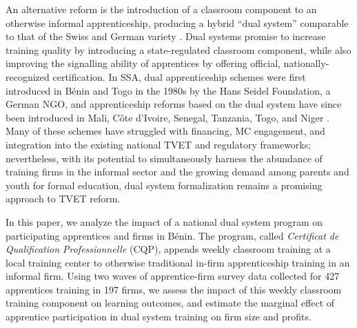 \documentclass[
  a4paper, twoside, 12pt]{book}
\begin{document}
An alternative reform is the introduction of a classroom component to an otherwise informal apprenticeship, producing a hybrid ``dual system'' comparable to that of the Swiss and German variety \autocite{walther2011}. Dual systems promise to increase training quality by introducing a state-regulated classroom component, while also improving the signalling ability of apprentices by offering official, nationally-recognized certification. In SSA, dual apprenticeship schemes were first introduced in Bénin and Togo in the 1980s by the Hans Seidel Foundation, a German NGO, and apprenticeship reforms based on the dual system have since been introduced in Mali, Côte d'Ivoire, Senegal, Tanzania, Togo, and Niger \autocite{walther2011,ilo2020a}. Many of these schemes have struggled with financing, MC engagement, and integration into the existing national TVET and regulatory frameworks; nevertheless, with its potential to simultaneously harness the abundance of training firms in the informal sector and the growing demand among parents and youth for formal education, dual system formalization remains a promising approach to TVET reform.

In this paper, we analyze the impact of a national dual system program on participating apprentices and firms in Bénin. The program, called \emph{Certificat de Qualification Professionnelle} (CQP), appends weekly classroom training at a local training center to otherwise traditional in-firm apprenticeship training in an informal firm. Using two waves of apprentice-firm survey data collected for 427 apprentices training in 197 firms, we assess the impact of this weekly classroom training component on learning outcomes, and estimate the marginal effect of apprentice participation in dual system training on firm size and profits.
\end{document}
